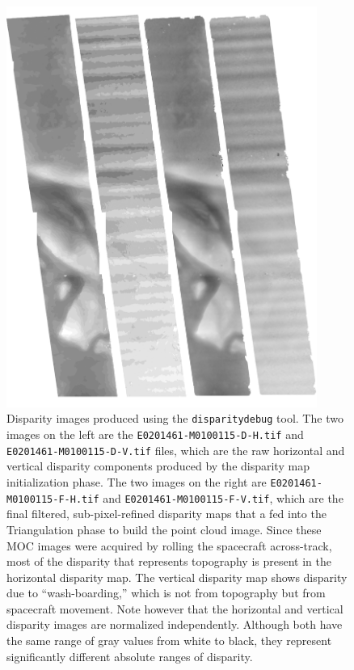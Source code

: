 \begin{figure}[b!]
\begin{minipage}{4in}
\includegraphics[width=4in]{images/p19-disparity.png}
\end{minipage}
\hfill
\begin{minipage}{2.7in}
\caption[P19 disparity images]{
    \label{p19-disparity}
	Disparity images produced using the \texttt{disparitydebug}
        tool.  The two images on the left are the
        \texttt{E0201461-M0100115-D-H.tif} and
        \texttt{E0201461-M0100115-D-V.tif} files, which are the raw
        horizontal and vertical disparity components produced by the
        disparity map initialization phase.  The two images on the
        right are \texttt{E0201461-M0100115-F-H.tif} and
        \texttt{E0201461-M0100115-F-V.tif}, which are the final
        filtered, sub-pixel-refined disparity maps that a fed into the
        Triangulation phase to build the point cloud image.  Since
        these MOC images were acquired by rolling the spacecraft
        across-track, most of the disparity that represents topography
        is present in the horizontal disparity map.  The vertical
        disparity map shows disparity due to ``wash-boarding,'' which
        is not from topography but from spacecraft movement. Note
        however that the horizontal and vertical disparity images are
        normalized independently.  Although both have the same range
        of gray values from white to black, they represent
        significantly different absolute ranges of disparity.}
\end{minipage}
\end{figure}

